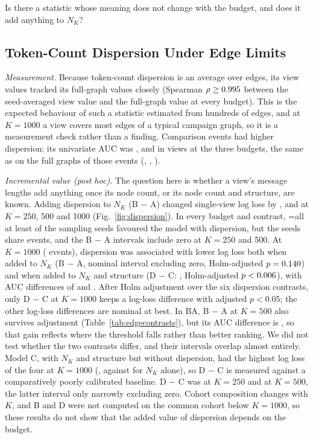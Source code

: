\documentclass[conference]{IEEEtran}
\newcommand{\NK}{N_K}
\newcommand{\TokSeedsPhrase}{\ifnum\RTokSeedsMin=\RTokSeedsN\relax all \RTokSeedsN\else at least \RTokSeedsMin{} of the \RTokSeedsN\fi}
\begin{document}
Is there a statistic whose meaning does not change with the budget, and does it add anything to $\NK$?

\subsection{Token-Count Dispersion Under Edge Limits}\label{sec:dispersion}
\emph{Measurement.} Because token-count dispersion is an average over edges, its view values tracked its full-graph values closely (Spearman $\rho\ge0.995$ between the seed-averaged view value and the full-graph value at every budget). This is the expected behaviour of such a statistic estimated from hundreds of edges, and at $K=1000$ a view covers most edges of a typical campaign graph, so it is a measurement check rather than a finding. Comparison events had higher dispersion: its univariate AUC was \RTokUniAUCTwoFifty, \RTokUniAUCFiveHundred{} and \RTokUniAUCThousand{} in views at the three budgets, the same as on the full graphs of those events (\RTokUniAUCFullTwoFifty, \RTokUniAUCFullFiveHundred, \RTokUniAUCFullThousand).

\emph{Incremental value (post hoc).} The question here is whether a view's message lengths add anything once its node count, or its node count and structure, are known. Adding dispersion to $\NK$ (B $-$ A) changed single-view log loss by \RTokBALLTwoFifty{} \RTokBALLCITwoFifty, \RTokBALLFiveHundred{} \RTokBALLCIFiveHundred{} and \RTokBALLThousand{} \RTokBALLCIThousand{} at $K=250$, 500 and 1000 (Fig.~\ref{fig:dispersion}). In every budget and contrast, \TokSeedsPhrase{} sampling seeds favoured the model with dispersion, but the seeds share events, and the B $-$ A intervals include zero at $K=250$ and 500. At $K=1000$ (\REligThousand{} events), dispersion was associated with lower log loss both when added to $\NK$ (B $-$ A, nominal interval excluding zero, Holm-adjusted $p=0.140$) and when added to $\NK$ and structure (D $-$ C: \RTokDCLLThousand{} \RTokDCLLCIThousand, Holm-adjusted $p<0.006$), with AUC differences of \RTokBAAUCThousand{} \RTokBAAUCCIThousand{} and \RTokDCAUCThousand{} \RTokDCAUCCIThousand. After Holm adjustment over the six dispersion contrasts, only D $-$ C at $K=1000$ keeps a log-loss difference with adjusted $p<0.05$; the other log-loss differences are nominal at best. In BA, B $-$ A at $K=500$ also survives adjustment (Table~\ref{tab:edgecontrasts}), but its AUC difference is \RTokBAAUCFiveHundred{} \RTokBAAUCCIFiveHundred, so that gain reflects where the threshold falls rather than better ranking. We did not test whether the two contrasts differ, and their intervals overlap almost entirely. Model C, with $\NK$ and structure but without dispersion, had the highest log loss of the four at $K=1000$ (\RCLLThousand, against \RNKLLThousand{} for $\NK$ alone), so D $-$ C is measured against a comparatively poorly calibrated baseline. D $-$ C was \RTokDCLLTwoFifty{} \RTokDCLLCITwoFifty{} at $K=250$ and \RTokDCLLFiveHundred{} \RTokDCLLCIFiveHundred{} at $K=500$, the latter interval only narrowly excluding zero. Cohort composition changes with $K$, and B and D were not computed on the common cohort below $K=1000$, so these results do not show that the added value of dispersion depends on the budget.
\end{document}
